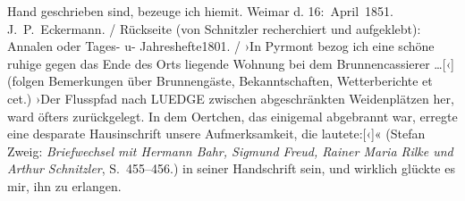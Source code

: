 {{{                        Hand geschrieben sind, bezeuge ich hiemit. Weimar d. 16: April 1851. J. P. Eckermann.{ / }Rückseite (von Schnitzler recherchiert
                        und aufgeklebt): Annalen oder Tages- u-
                           Jahreshefte1801.{ / }›In Pyrmont bezog ich eine schöne ruhige gegen das
                           Ende des Orts liegende Wohnung bei dem Brunnencassierer {\dots}{[}‹{]} (folgen Bemerkungen über Brunnengäste,
                           Bekanntschaften, Wetterberichte et cet.) ›Der Flusspfad nach LUEDGE zwischen abgeschränkten Weidenplätzen her, ward öfters
                           zurückgelegt. In dem Oertchen, das einigemal abgebrannt war, erregte eine
                           desparate Hausinschrift unsere Aufmerksamkeit, die
                              lautete:{[}‹{]}\pwindex{Hausspruch von Goethe]@\emph{[Hausspruch von Goethe]}|pwv}« (Stefan Zweig: \emph{Briefwechsel mit Hermann Bahr, Sigmund Freud, Rainer Maria Rilke und Arthur
                        Schnitzler}, S. 455–456.)}}}\label{K_L03626-3} in seiner Handschrift sein, und wirklich glückte es mir, ihn zu
               erlangen.\pend
           

